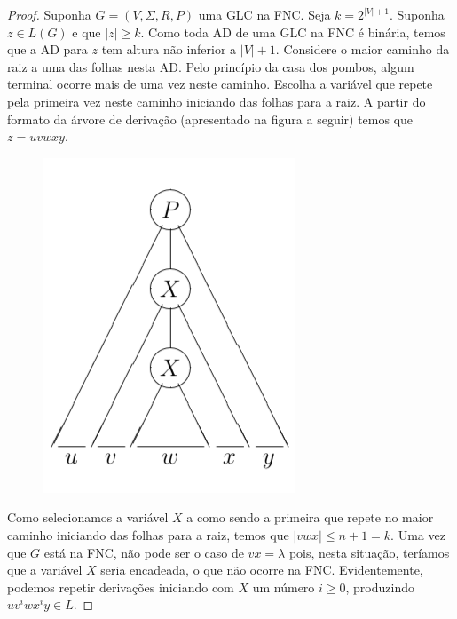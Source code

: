 \documentclass[a4paper]{article}
\theoremstyle{definition}
\begin{document}
  \begin{proof}
    Suponha $G = (V,\Sigma,R,P)$ uma GLC na FNC. Seja $k = 2^{|V| + 1}$.
    Suponha $z \in L(G)$ e que $|z| \geq k$. Como toda AD de uma GLC na FNC é
    binária, temos que a AD para $z$ tem altura não inferior a $|V| + 1$.
    Considere o maior caminho da raiz a uma das folhas nesta AD. Pelo princípio
    da casa dos pombos, algum terminal ocorre mais de uma vez neste caminho.
    Escolha a variável que repete pela primeira vez neste caminho iniciando das
    folhas para a raiz. A partir do formato da árvore de derivação (apresentado
    na figura a seguir) temos que $z = uvwxy$. 
    \begin{figure}[H]
      \includegraphics[scale=.4]{tree.png}
      \centering
    \end{figure}
    Como selecionamos a variável $X$
    a como sendo a primeira que repete no maior caminho iniciando das folhas
    para a raiz, temos que $|vwx| \leq n + 1 = k$. Uma vez que $G$ está na FNC,
    não pode ser o caso de $vx = \lambda$ pois, nesta situação, teríamos que a
    variável $X$ seria encadeada, o que não ocorre na FNC.  Evidentemente,
    podemos repetir derivações iniciando com $X$ um número $i\geq 0$, produzindo
    $ uv^iwx^iy \in L$.
  \end{proof}
\end{document}

